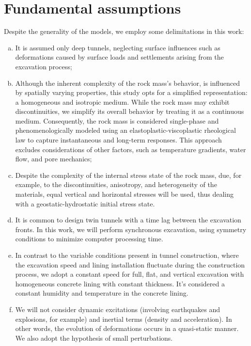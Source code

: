 \documentclass[a4paper,fleqn]{cas-sc}
\begin{document}
\section{Fundamental assumptions}\label{}

Despite the generality of the models, we employ some delimitations in this work:

\begin{enumerate}[(a)]
	\item It is assumed only deep tunnels, neglecting surface influences such as deformations caused by surface loads and settlements arising from the excavation process;

	\item Although the inherent complexity of the rock mass's behavior, is influenced by spatially varying properties, this study opts for a simplified representation: a homogeneous and isotropic medium. While the rock mass may exhibit discontinuities, we simplify its overall behavior by treating it as a continuous medium. Consequently, the rock mass is considered single-phase and phenomenologically modeled using an elastoplastic-viscoplastic rheological law to capture instantaneous and long-term responses. This approach excludes considerations of other factors, such as temperature gradients, water flow, and pore mechanics;

	\item Despite the complexity of the internal stress state of the rock mass, due, for example, to the discontinuities, anisotropy, and heterogeneity of the materials, equal vertical and horizontal stresses will be used, thus dealing with a geostatic-hydrostatic initial stress state.

	\item It is common to design twin tunnels with a time lag between the excavation fronts. In this work, we will perform synchronous excavation, using symmetry conditions to minimize computer processing time.

	\item In contrast to the variable conditions present in tunnel construction, where the excavation speed and lining installation fluctuate during the construction process, we adopt a constant speed for full, flat, and vertical excavation with homogeneous concrete lining with constant thickness. It's considered a constant humidity and temperature in the concrete lining.

	\item We will not consider dynamic excitations (involving earthquakes and explosions, for example) and inertial terms (density and acceleration). In other words, the evolution of deformations occurs in a quasi-static manner. We also adopt the hypothesis of small perturbations.
\end{enumerate}
\end{document}

